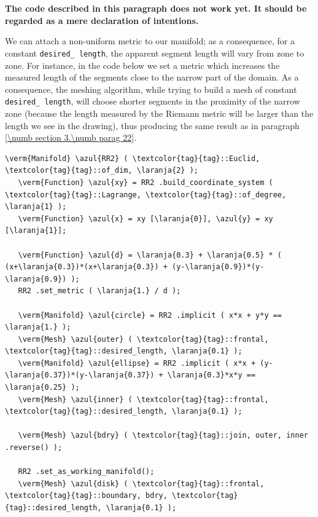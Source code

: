 \section{~~}\label{\numb section 3.\numb parag 23}
 
{\normalfont\bfseries The code described in this paragraph does not work yet.
It should be regarded as a mere declaration of intentions.}
\medskip

We can attach a non-uniform metric to our manifold; as a consequence, for a constant
{\small\tt desired\_\,length}, the apparent segment length will vary from zone to zone.
For instance, in the code below we set a metric which increases the measured length
of the segments close to the narrow part of the domain.
As a consequence, the meshing algorithm, while trying to build a mesh of constant
{\small\tt desired\_\,length}, will choose shorter segments in the proximity of the narrow zone
(because the length measured by the Riemann metric will be larger than the length
we see in the drawing), thus producing the same result as in paragraph
\ref{\numb section 3.\numb parag 22}.

\begin{Verbatim}[commandchars=\\\{\},formatcom=\small\tt,frame=single,
   label=code not working,rulecolor=\color{moldura},
   baselinestretch=0.94,framesep=2mm                                   ]
   \verm{Manifold} \azul{RR2} ( \textcolor{tag}{tag}::Euclid, \textcolor{tag}{tag}::of_dim, \laranja{2} );
   \verm{Function} \azul{xy} = RR2 .build_coordinate_system ( \textcolor{tag}{tag}::Lagrange, \textcolor{tag}{tag}::of_degree, \laranja{1} );
   \verm{Function} \azul{x} = xy [\laranja{0}], \azul{y} = xy [\laranja{1}];

   \verm{Function} \azul{d} = \laranja{0.3} + \laranja{0.5} * ( (x+\laranja{0.3})*(x+\laranja{0.3}) + (y-\laranja{0.9})*(y-\laranja{0.9}) );
   RR2 .set_metric ( \laranja{1.} / d );
   
   \verm{Manifold} \azul{circle} = RR2 .implicit ( x*x + y*y == \laranja{1.} );
   \verm{Mesh} \azul{outer} ( \textcolor{tag}{tag}::frontal, \textcolor{tag}{tag}::desired_length, \laranja{0.1} );
   \verm{Manifold} \azul{ellipse} = RR2 .implicit ( x*x + (y-\laranja{0.37})*(y-\laranja{0.37}) + \laranja{0.3}*x*y == \laranja{0.25} );
   \verm{Mesh} \azul{inner} ( \textcolor{tag}{tag}::frontal, \textcolor{tag}{tag}::desired_length, \laranja{0.1} );

   \verm{Mesh} \azul{bdry} ( \textcolor{tag}{tag}::join, outer, inner .reverse() );

   RR2 .set_as_working_manifold();
   \verm{Mesh} \azul{disk} ( \textcolor{tag}{tag}::frontal, \textcolor{tag}{tag}::boundary, bdry, \textcolor{tag}{tag}::desired_length, \laranja{0.1} );
\end{Verbatim}

